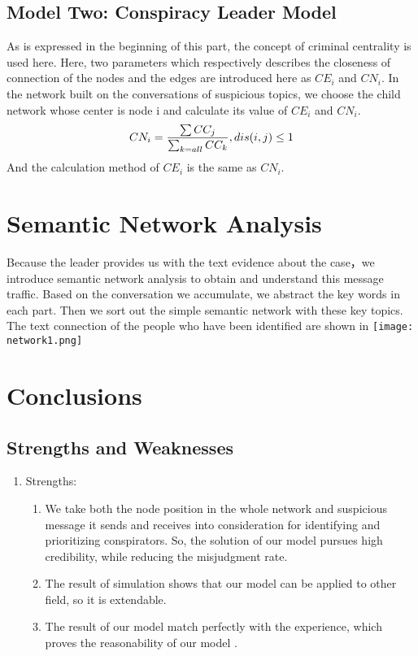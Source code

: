 \documentclass[12pt]{article}
\begin{document}
\begin{itemize}
\begin{itemize}
\subsection{Model Two: Conspiracy Leader Model}
	As is expressed in the beginning of this part, the concept of criminal centrality is used here.
	Here, two parameters which respectively describes the closeness of connection of the nodes and the edges are introduced here as $CE_i$ and $CN_i$. In the network built on the conversations of suspicious topics, we choose the child network whose center is node i and calculate its value of $CE_i$ and $CN_i$.
\begin{equation}
\centering
CN_i = \frac{\sum CC_j}{\sum_{k=all} CC_k} , dis(i,j) \le 1
\end{equation}
	And the calculation method of  $CE_i$ is the same as $CN_i$.

\section{Semantic Network Analysis}
Because the leader provides us with the text evidence about the case，we introduce semantic network analysis to obtain and understand this message traffic. Based on the conversation we accumulate, we abstract the key words in each part. Then we sort out the simple semantic network with these key topics. The text connection of the people who have been identified are shown in %
\texttt{[image: network1.png]}
\section{Conclusions}
\subsection{Strengths and Weaknesses}
\begin{enumerate}
\item Strengths: 
\begin{enumerate}
\item We take both the node position in the whole network and suspicious message it sends and receives into consideration for identifying and prioritizing conspirators. So, the solution of our model pursues high credibility, while reducing the misjudgment rate. 
\item The result of simulation shows that our model can be applied to other field, so it is extendable.
\item The result of our model match perfectly with the experience, which proves the reasonability of our model .
\end{enumerate}


\end{enumerate}
\end{itemize}
\end{itemize}
\end{document}
